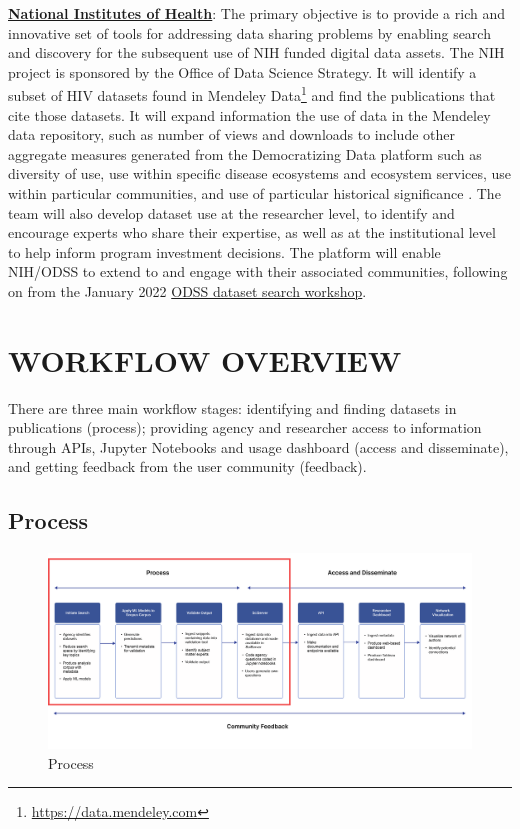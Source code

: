 \documentclass[titlepage, 11pt]{article}
\begin{document}
{\underline{\textbf{National Institutes of Health}}: The primary objective is to provide a rich and innovative set of tools for addressing data sharing problems by enabling search and discovery for the subsequent use of NIH funded digital data assets. The NIH project is sponsored by the Office of Data Science Strategy.  It will identify a subset of HIV datasets found in Mendeley Data\footnote{\url{https://data.mendeley.com}} and find the publications that cite those datasets.  It will expand information the use of data in the Mendeley data repository, such as number of views and downloads to include other aggregate measures generated from the Democratizing Data platform such as diversity of use, use within specific disease ecosystems and ecosystem services, use within particular communities, and use of particular historical significance\cite{source2} . The team will also develop dataset use at the researcher level, to identify and encourage experts who share their expertise, as well as at the institutional level to help inform program investment decisions. The platform will enable NIH/ODSS to extend to and engage with their associated communities, following on from the January 2022 \href{https://datascience.nih.gov/data-infrastructure/search-workshop}{ODSS dataset search workshop}\cite{source2}.  

\section{WORKFLOW OVERVIEW}
\label{sec:Chapter3}
There are three main workflow stages: identifying and finding datasets in publications (process); providing agency and researcher access to information through APIs, Jupyter Notebooks and usage dashboard (access and disseminate), and getting feedback from the user community (feedback).

\subsection{Process}

\begin{figure}
  \includegraphics[scale=0.20]{Process.png}
  \vspace{-2.5ex}
  \caption{Process}
    \vspace{-0.97ex}
  \label{fig:process}
\end{figure}

}
\end{document}
